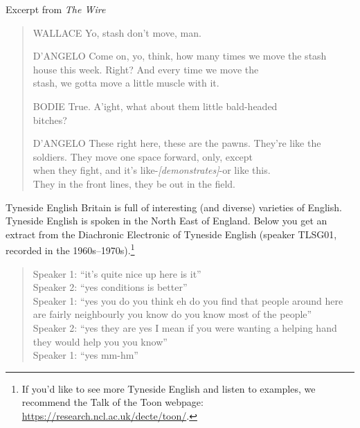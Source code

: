 \begin{texts}{Excerpt from \emph{The Wire}}
\begin{quote}
    WALLACE\phantom{X} Yo, stash don't move, man.

    D'ANGELO Come on, yo, think, how many times we move the stash\\
    \phantom{D'ANGELO} house this week. Right? And every time we move the\\ 
    \phantom{D'ANGELO} stash, we gotta move a little muscle with it.

    BODIE\phantom{XXX} True. A'ight, what about them little bald-headed\\
    \phantom{BODIEXXX} bitches?

    D'ANGELO These right here, these are the pawns. They're like the\\
    \phantom{D'ANGELO} soldiers. They move one space forward, only, except\\
    \phantom{D'ANGELO} when they fight, and it's like-\emph{[demonstrates]}-or like this.\\
    \phantom{D'ANGELO} They in the front lines, they be out in the field.
\end{quote}

\end{texts}

\begin{texts}{Tyneside English}
Britain is full of interesting (and diverse) varieties of English. Tyneside English is spoken in the North East of England. Below you get an extract from the Diachronic Electronic  of Tyneside English (speaker TLSG01, recorded in the 1960s--1970s).\footnote{If you'd like to see more Tyneside English and listen to examples, we recommend the Talk of the Toon webpage: \url{https://research.ncl.ac.uk/decte/toon/}.}

\begin{quote}
    \internallinenumbers*{}
    Speaker 1: ``it's quite nice up here is it''\\
    Speaker 2: ``yes conditions is better''\\
    Speaker 1: ``yes you do you think eh do you find that people around here are fairly neighbourly you know do you know most of the people''\\
    Speaker 2: ``yes they are yes I mean if you were wanting a helping hand they would help you you know''\\
    Speaker 1: ``yes mm-hm''
\end{quote}
\end{texts}

